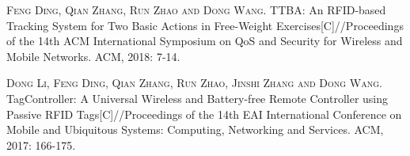 
\begin{publications}{99}
    \item\textsc{Feng Ding, Qian Zhang, Run Zhao and Dong Wang}. TTBA: An RFID-based Tracking System for Two Basic Actions in Free-Weight Exercises[C]//Proceedings of the 14th ACM International Symposium on QoS and Security for Wireless and Mobile Networks. ACM, 2018: 7-14.
    \item\textsc{Dong Li, Feng Ding, Qian Zhang, Run Zhao, Jinshi Zhang and Dong Wang}. TagController: A Universal Wireless and Battery-free Remote Controller using Passive RFID Tags[C]//Proceedings of the 14th EAI International Conference on Mobile and Ubiquitous Systems: Computing, Networking and Services. ACM, 2017: 166-175.
\end{publications}
